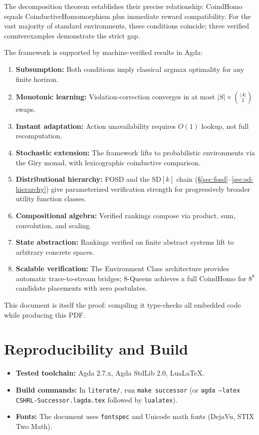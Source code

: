 \documentclass[9pt,a4paper]{article}
\theoremstyle{plain}
\theoremstyle{definition}
\theoremstyle{remark}
\begin{document}
\noindent The decomposition theorem establishes their precise relationship: CoindHomo equals CoinductiveHomomorphism plus immediate reward compatibility.  For the vast majority of standard environments, these conditions coincide; three verified counterexamples demonstrate the strict gap.

The framework is supported by machine-verified results in Agda:
\begin{enumerate}
\item \textbf{Subsumption:} Both conditions imply classical argmax optimality for any finite horizon.
\item \textbf{Monotonic learning:} Violation-correction converges in at most $|S| \times \binom{|A|}{2}$ swaps.
\item \textbf{Instant adaptation:} Action unavailability requires $O(1)$ lookup, not full recomputation.
\item \textbf{Stochastic extension:} The framework lifts to probabilistic environments via the Giry monad, with lexicographic coinductive comparison.
\item \textbf{Distributional hierarchy:} FOSD and the SD$[k]$ chain (\S\ref{sec:fosd}--\ref{sec:sd-hierarchy}) give parameterized verification strength for progressively broader utility function classes.
\item \textbf{Compositional algebra:} Verified rankings compose via product, sum, convolution, and scaling.
\item \textbf{State abstraction:} Rankings verified on finite abstract systems lift to arbitrary concrete spaces.
\item \textbf{Scalable verification:} The Environment Class architecture provides automatic trace-to-stream bridges; 8-Queens achieves a full CoindHomo for $8^8$ candidate placements with zero postulates.
\end{enumerate}

\noindent This document is itself the proof: compiling it type-checks all embedded code while producing this PDF.

\section{Reproducibility and Build}

\begin{itemize}
\item \textbf{Tested toolchain:} Agda 2.7.x, Agda StdLib 2.0, Lua\LaTeX.
\item \textbf{Build commands:} In \texttt{literate/}, run \texttt{make successor} (or \texttt{agda --latex CSHRL-Successor.lagda.tex} followed by \texttt{lualatex}).
\item \textbf{Fonts:} The document uses \texttt{fontspec} and Unicode math fonts (DejaVu, STIX Two Math).
\end{itemize}
\end{document}
